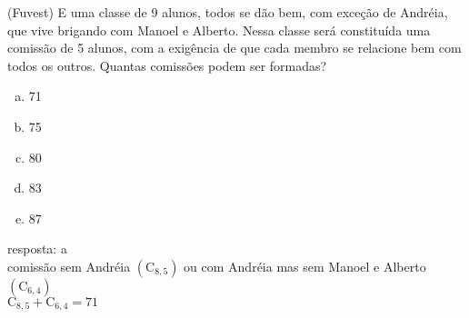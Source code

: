 \begin{ex}
 (Fuvest) E uma classe de 9 alunos, todos se dão bem, com exceção de Andréia, que vive brigando com Manoel e Alberto.
Nessa classe será constituída uma comissão de 5 alunos, com a exigência de que cada membro se relacione bem com todos os outros. Quantas comissões podem ser formadas?
    \begin{enumerate}[(a)]
    \item 71
    \item 75
    \item 80
    \item 83
    \item 87
    \end{enumerate}
     \begin{sol}
        resposta: a  \\
        comissão sem Andréia $(\mathrm{C}_{8,5})$\hspace{0.1cm} ou\hspace{0.1cm} com Andréia mas sem Manoel e Alberto $(\mathrm{C}_{6,4})$ \\
        $\mathrm{C}_{8,5}+\mathrm{C}_{6,4}=71$
     \end{sol}
\end{ex}